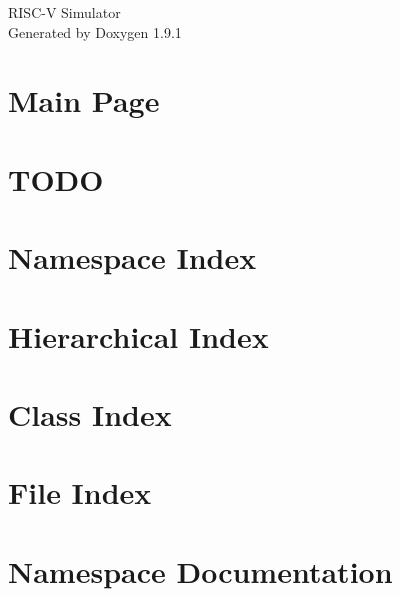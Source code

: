 \let\mypdfximage\pdfximage\def\pdfximage{\immediate\mypdfximage}\documentclass[twoside]{book}
\newcommand{\+}{\discretionary{\mbox{\scriptsize$\hookleftarrow$}}{}{}}
\newcommand{\clearemptydoublepage}{%
  \newpage{\pagestyle{empty}\cleardoublepage}%
}
\begin{document}
\raggedbottom

\hypersetup{pageanchor=false,
             bookmarksnumbered=true,
             pdfencoding=unicode
            }
\begin{titlepage}
\vspace*{7cm}
\begin{center}%
{\Large RISC-\/V Simulator }\\
\vspace*{1cm}
{\large Generated by Doxygen 1.9.1}\\
\end{center}
\end{titlepage}
\clearemptydoublepage
{}
\tableofcontents
\clearemptydoublepage
{}
\hypersetup{pageanchor=true}

\chapter{Main Page}
\label{index}\hypertarget{index}{}
\chapter{TODO}
\label{md_TODO}

\chapter{Namespace Index}

\chapter{Hierarchical Index}

\chapter{Class Index}

\chapter{File Index}

\chapter{Namespace Documentation}









\end{document}
